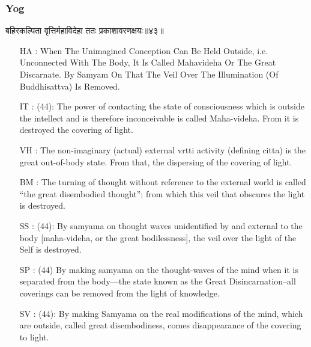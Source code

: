 \begin{frame}[fragile]\frametitle{Yog}
\begin{sanskrit}
बहिरकल्पिता वृत्तिर्महाविदेहा ततः प्रकाशावरणक्षयः॥४३॥
\end{sanskrit}

	\begin{itemize}
	\item [HA]: When The Unimagined Conception Can Be Held Outside, i.e. Unconnected With The Body, It Is Called Mahavideha Or The Great Discarnate. By Samyam On That The Veil Over The Illumination (Of Buddhisattva) Is Removed.
	\item [IT]: (44): The power of contacting the state of consciousness which is outside the intellect and is therefore inconceivable is called Maha-videha. From it is destroyed the covering of light.
	\item [VH]: The non-imaginary (actual) external vrtti activity (defining citta) is the great out-of-body state. From that, the dispersing of the covering of light.
	\item [BM]: The turning of thought without reference to the external world is called “the great disembodied thought”; from which this veil that obscures the light is destroyed.
	\item [SS]: (44): By samyama on thought waves unidentified by and external to the body [maha-videha, or the great bodilessness], the veil over the light of the Self is destroyed.
	\item [SP]: (44) By making samyama on the thought-waves of the mind when it is separated from the body—the state known as the Great Disincarnation–all coverings can be removed from the light of knowledge.
	\item [SV]: (44): By making Samyama on the real modifications of the mind, which are outside, called great disembodiness, comes disappearance of the covering to light. 
	\end{itemize}
\end{frame}


